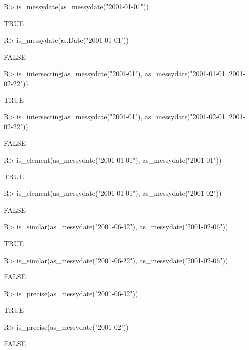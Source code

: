 \documentclass[
]{jss}
\begin{document}
\begin{CodeChunk}
\begin{CodeInput}
R> is_messydate(as_messydate("2001-01-01"))
\end{CodeInput}
\begin{CodeOutput}
[1] TRUE
\end{CodeOutput}
\begin{CodeInput}
R> is_messydate(as.Date("2001-01-01"))
\end{CodeInput}
\begin{CodeOutput}
[1] FALSE
\end{CodeOutput}
\begin{CodeInput}
R> is_intersecting(as_messydate("2001-01"), as_messydate("2001-01-01..2001-02-22"))
\end{CodeInput}
\begin{CodeOutput}
[1] TRUE
\end{CodeOutput}
\begin{CodeInput}
R> is_intersecting(as_messydate("2001-01"), as_messydate("2001-02-01..2001-02-22"))
\end{CodeInput}
\begin{CodeOutput}
[1] FALSE
\end{CodeOutput}
\begin{CodeInput}
R> is_element(as_messydate("2001-01-01"), as_messydate("2001-01"))
\end{CodeInput}
\begin{CodeOutput}
[1] TRUE
\end{CodeOutput}
\begin{CodeInput}
R> is_element(as_messydate("2001-01-01"), as_messydate("2001-02"))
\end{CodeInput}
\begin{CodeOutput}
[1] FALSE
\end{CodeOutput}
\begin{CodeInput}
R> is_similar(as_messydate("2001-06-02"), as_messydate("2001-02-06"))
\end{CodeInput}
\begin{CodeOutput}
[1] TRUE
\end{CodeOutput}
\begin{CodeInput}
R> is_similar(as_messydate("2001-06-22"), as_messydate("2001-02-06"))
\end{CodeInput}
\begin{CodeOutput}
[1] FALSE
\end{CodeOutput}
\begin{CodeInput}
R> is_precise(as_messydate("2001-06-02"))
\end{CodeInput}
\begin{CodeOutput}
[1] TRUE
\end{CodeOutput}
\begin{CodeInput}
R> is_precise(as_messydate("2001-02"))
\end{CodeInput}
\begin{CodeOutput}
[1] FALSE
\end{CodeOutput}
\end{CodeChunk}
\end{document}
